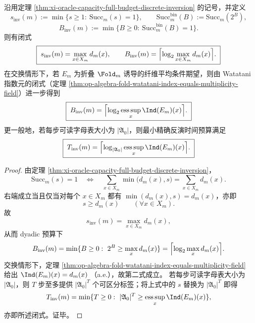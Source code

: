 \begin{theorem}[精确反演阈值等于峰值纤维指数]\label{thm:xi-exact-inversion-threshold-peak-index}
沿用定理 \ref{thm:xi-oracle-capacity-full-budget-discrete-inversion} 的记号，并定义
\[
s_{\mathrm{inv}}(m)
:=
\min\{s\ge 1:\ \mathrm{Succ}_m(s)=1\},
\qquad
\mathrm{Succ}^{\mathrm{bin}}_m(B):=\mathrm{Succ}_m(2^B),
\]
\[
B_{\mathrm{inv}}(m)
:=
\min\{B\ge 0:\ \mathrm{Succ}^{\mathrm{bin}}_m(B)=1\}.
\]
则有闭式
\[
\boxed{\;
s_{\mathrm{inv}}(m)=\max_{x\in X_m}d_m(x),\qquad
B_{\mathrm{inv}}(m)=\Bigl\lceil\log_2\max_{x\in X_m}d_m(x)\Bigr\rceil.\;}
\]
在交换情形下，若 \(E_m\) 为折叠 \(\Fold_m\) 诱导的纤维平均条件期望，则由 Watatani 指数元的闭式（定理 \ref{thm:op-algebra-fold-watatani-index-equals-multiplicity-field}）进一步得到
\[
\boxed{\;
B_{\mathrm{inv}}(m)
=
\Bigl\lceil
\log_2 \operatorname*{ess\,sup}_{x}\Ind(E_m)(x)
\Bigr\rceil.\;}
\]
更一般地，若每步可读字母表大小为 \(|\mathfrak A_0|\)，则最小精确反演时间预算满足
\[
\boxed{\;
T_{\mathrm{inv}}(m)
=
\Bigl\lceil
\log_{|\mathfrak A_0|}
\operatorname*{ess\,sup}_{x}\Ind(E_m)(x)
\Bigr\rceil.\;}
\]
\end{theorem}
\begin{proof}
由定理 \ref{thm:xi-oracle-capacity-full-budget-discrete-inversion}，
\[
\mathrm{Succ}_m(s)=1
\quad\Longleftrightarrow\quad
\sum_{x\in X_m}\min\bigl(d_m(x),s\bigr)=\sum_{x\in X_m}d_m(x).
\]
右端成立当且仅当对每个 \(x\in X_m\) 都有 \(\min(d_m(x),s)=d_m(x)\)，亦即
\[
s\ge d_m(x)\qquad(\forall x\in X_m).
\]
故
\[
s_{\mathrm{inv}}(m)=\max_{x\in X_m}d_m(x),
\]
从而 dyadic 预算下
\[
B_{\mathrm{inv}}(m)
=
\min\{B\ge 0:\ 2^B\ge \max_x d_m(x)\}
=
\Bigl\lceil\log_2\max_x d_m(x)\Bigr\rceil.
\]
交换情形下，定理 \ref{thm:op-algebra-fold-watatani-index-equals-multiplicity-field} 给出
\(
\Ind(E_m)(x)=d_m(x)
\)
（a.e.），故第二式成立。
若每步可读字母表大小为 \(|\mathfrak A_0|\)，则 \(T\) 步至多提供 \(|\mathfrak A_0|^T\) 个可区分标签；将上式中的 \(s\) 替换为 \(|\mathfrak A_0|^T\) 即得
\[
T_{\mathrm{inv}}(m)
=
\min\{T\ge 0:\ |\mathfrak A_0|^T\ge \operatorname*{ess\,sup}_x \Ind(E_m)(x)\},
\]
亦即所述闭式。证毕。
\end{proof}

